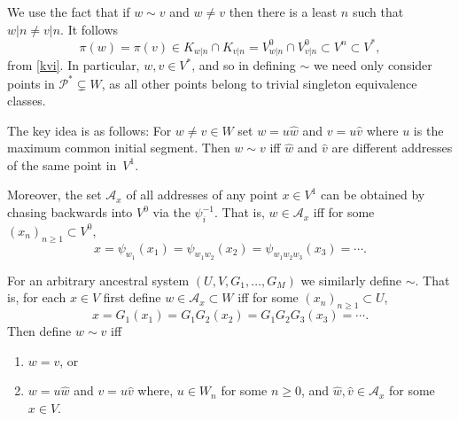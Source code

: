 \documentclass[a4paper]{amsart}
\theoremstyle{plain}
\theoremstyle{definition}
\theoremstyle{remark}
\begin{document}
 We use the fact that if $ w \sim v $ and $ w \neq v $ then there is a least $ n $ such that $ w|n \neq v|n $.  It follows
\[
\pi(w) = \pi(v) \in \boxed{K_{w|n} \cap K_{v|n} = V^{0}_{w|n} \cap V^{0}_{v|n}} \subset V^{n} \subset V^* , 
\]
from \eqref{kvi}.  In particular, $ w,v \in V^* $, and so in defining $ \sim $ we need only consider points in $ \mathcal{P} ^* \subsetneq W$, as all other  points belong to trivial singleton equivalence classes.

\medskip The key idea is as follows:  For $ w\neq v \in W $  set $ w = u \hat{w} $ and $ v = u \hat{v} $ where $ u $ is the maximum common initial segment.  Then $ w \sim v $ iff $   \hat{w} $ and   $  \hat{v} $ are different addresses of the same point in~$ V^{1} $.

Moreover, the set $ \mathcal{A}_x $ of all addresses of any point $ x \in V^{1} $  can be obtained by chasing backwards into $ V^{0} $ via the $ \psi_i^{-1}$. That is, $ w \in \mathcal{A}_ x $ 
 iff for some $ (x_n)_{n\geq 1} \subset V^{0} $, 
\[
x = \psi_{w_1}(x_1) = \psi_{w_1w_2}(x_2) = \psi_{w_1w_2w_3}(x_3) =  \cdots .
\]

%





\medskip
 For an arbitrary ancestral system $ (U,V, G_1,\dots ,G_M) $ we similarly define $ \sim $.  That is, for each $ x\in V $ first define $ w \in  \mathcal{A}_ x \subset W $ iff for some $ (x_n)_{n\geq 1} \subset U $, 
\[
x = G_1 (x_1) =G_1G_2 (x_2) = G_1G_2G_3(x_3) =  \cdots .
\]
Then define
$ w \sim  v $ iff
\begin{enumerate}

\item $ w=v $, or
\item $ w = u \hat{w} $ and $ v = u \hat {v} $ where, $ u \in W_n $ for some $ n\geq 0 $,  and $ \hat{w} , \hat{v}\in \mathcal{A}_x $ for some $ x \in V$.
\end{enumerate}  
\end{document}
